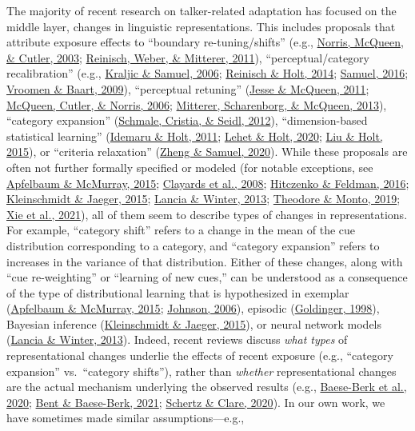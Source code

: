 \documentclass[
  11pt,
  english,
  man,floatsintext]{apa6}
\begin{document}
The majority of recent research on talker-related adaptation has focused on the middle layer, changes in linguistic representations. This includes proposals that attribute exposure effects to ``boundary re-tuning/shifts'' (e.g., \protect\hyperlink{ref-norris2003}{Norris, McQueen, \& Cutler, 2003}; \protect\hyperlink{ref-reinisch2011}{Reinisch, Weber, \& Mitterer, 2011}), ``perceptual/category recalibration'' (e.g., \protect\hyperlink{ref-kraljic-samuel2006}{Kraljic \& Samuel, 2006}; \protect\hyperlink{ref-reinisch-holt2014}{Reinisch \& Holt, 2014}; \protect\hyperlink{ref-samuel2016}{Samuel, 2016}; \protect\hyperlink{ref-vroomen-baart2009}{Vroomen \& Baart, 2009}), ``perceptual retuning'' (\protect\hyperlink{ref-jesse-mcqueen2011}{Jesse \& McQueen, 2011}; \protect\hyperlink{ref-mcqueen2006}{McQueen, Cutler, \& Norris, 2006}; \protect\hyperlink{ref-mitterer2013}{Mitterer, Scharenborg, \& McQueen, 2013}), ``category expansion'' (\protect\hyperlink{ref-schmale2012}{Schmale, Cristia, \& Seidl, 2012}), ``dimension-based statistical learning'' (\protect\hyperlink{ref-idemaru-holt2011}{Idemaru \& Holt, 2011}; \protect\hyperlink{ref-lehet-holt2020}{Lehet \& Holt, 2020}; \protect\hyperlink{ref-liu-holt2015}{Liu \& Holt, 2015}), or ``criteria relaxation'' (\protect\hyperlink{ref-zheng-samuel2020}{Zheng \& Samuel, 2020}). While these proposals are often not further formally specified or modeled (for notable exceptions, see \protect\hyperlink{ref-apfelbaum-mcmurray2015}{Apfelbaum \& McMurray, 2015}; \protect\hyperlink{ref-clayards2008}{Clayards et al., 2008}; \protect\hyperlink{ref-hitczenko-feldman2016}{Hitczenko \& Feldman, 2016}; \protect\hyperlink{ref-kleinschmidt-jaeger2015}{Kleinschmidt \& Jaeger, 2015}; \protect\hyperlink{ref-lancia-winter2013}{Lancia \& Winter, 2013}; \protect\hyperlink{ref-theodore-monto2019}{Theodore \& Monto, 2019}; \protect\hyperlink{ref-xie2021cognition}{Xie et al., 2021}), all of them seem to describe types of changes in representations. For example, ``category shift'' refers to a change in the mean of the cue distribution corresponding to a category, and ``category expansion'' refers to increases in the variance of that distribution. Either of these changes, along with ``cue re-weighting'' or ``learning of new cues,'' can be understood as a consequence of the type of distributional learning that is hypothesized in exemplar (\protect\hyperlink{ref-apfelbaum-mcmurray2015}{Apfelbaum \& McMurray, 2015}; \protect\hyperlink{ref-johnson2006}{Johnson, 2006}), episodic (\protect\hyperlink{ref-goldinger1998}{Goldinger, 1998}), Bayesian inference (\protect\hyperlink{ref-kleinschmidt-jaeger2015}{Kleinschmidt \& Jaeger, 2015}), or neural network models (\protect\hyperlink{ref-lancia-winter2013}{Lancia \& Winter, 2013}). Indeed, recent reviews discuss \emph{what types} of representational changes underlie the effects of recent exposure (e.g., ``category expansion'' vs.~``category shifts''), rather than \emph{whether} representational changes are the actual mechanism underlying the observed results (e.g., \protect\hyperlink{ref-baeseberk2020}{Baese-Berk et al., 2020}; \protect\hyperlink{ref-bent-baeseberk2021}{Bent \& Baese-Berk, 2021}; \protect\hyperlink{ref-schertz-clare2020}{Schertz \& Clare, 2020}). In our own work, we have sometimes made similar assumptions---e.g., 
\end{document}
